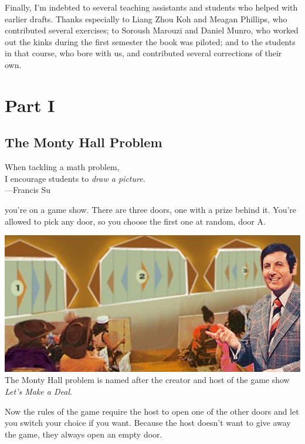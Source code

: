\documentclass[justified]{tufte-book}
\newenvironment{epigraph}%
{
\begin{flushright}    
\begin{minipage}{20em}
\begin{flushright}
\itshape
}%
{
\end{flushright}
\end{minipage}
\end{flushright}
}
\theoremstyle{definition}
\theoremstyle{definition}
\theoremstyle{definition}
\theoremstyle{remark}
\begin{document}
Finally, I'm indebted to several teaching assistants and students who helped with earlier drafts. Thanks especially to Liang Zhou Koh and Meagan Phillips, who contributed several exercises; to Soroush Marouzi and Daniel Munro, who worked out the kinks during the first semester the book was piloted; and to the students in that course, who bore with us, and contributed several corrections of their own.

\hypertarget{part-part-i}{%
\part*{Part I}\label{part-part-i}}

\hypertarget{the-monty-hall-problem}{%
\chapter{The Monty Hall Problem}\label{the-monty-hall-problem}}

\begin{epigraph}
When tackling a math problem,\\
I encourage students to \textit{draw a picture.}\\
---Francis Su
\end{epigraph}

 you're on a game show. There are three doors, one with a prize behind it. You're allowed to pick any door, so you choose the first one at random, door A.

\begin{marginfigure}
\includegraphics{img/lets_make_a_deal.png} The Monty Hall problem is
named after the creator and host of the game show \emph{Let's Make a
Deal}.
\end{marginfigure}

Now the rules of the game require the host to open one of the other doors and let you switch your choice if you want. Because the host doesn't want to give away the game, they always open an empty door.
\end{document}
